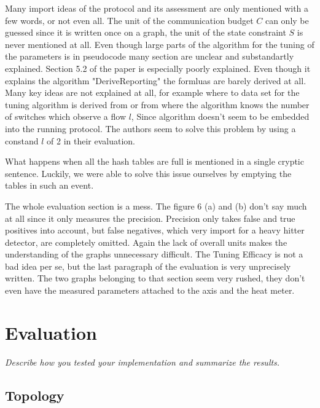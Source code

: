 \documentclass[11pt,oneside,a4paper]{article}
\newcommand{\hint}[1]{{\color{blue} \em #1}}
\begin{document}
Many import ideas of the protocol and its assessment are only mentioned with a few words, or not even all. The unit of the communication budget $C$ can only be guessed since it is written once on a graph, the unit of the state constraint $S$ is never mentioned at all. Even though large parts of the algorithm for the tuning of the parameters is in pseudocode many section are unclear and substandartly explained. Section 5.2 of the paper is especially poorly explained. Even though it explains the algorithm "DeriveReporting" the formluas are barely derived at all. %
Many key ideas are not explained at all, for example where to data set for the tuning algorithm is derived from or from where the algorithm knows the number of switches which observe a flow $l$, Since algorithm doesn't seem to be embedded into the running protocol. The authors seem to solve this problem by using a constand $l$ of 2 in their evaluation.

What happens when all the hash tables are full is mentioned in a single cryptic sentence. Luckily, we were able to solve this issue ourselves by emptying the tables in such an event.

The whole evaluation section is a mess.%
The figure 6 (a) and (b) don't say much at all since it only measures the precision. Precision only takes false and true positives into account,  but false negatives, which very import for a heavy hitter detector, are completely omitted. Again the lack of overall units makes the understanding of the graphs unnecessary difficult. The Tuning Efficacy is not a bad idea per se, but the last paragraph of the evaluation is very unprecisely written. The two graphs belonging to that section seem very rushed, they don't even have the measured parameters attached to the axis and the heat meter.


\section{Evaluation}
\hint{Describe how you tested your implementation and summarize the results.} \\
\subsection{Topology} \label{topology}
\end{document}
